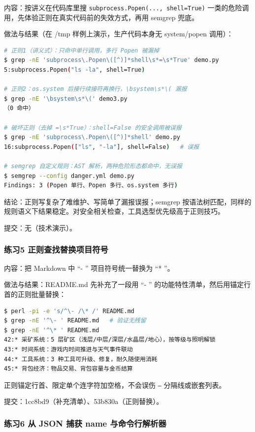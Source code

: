 \documentclass[UTF8]{ctexart}
\begin{document}
内容：按讲义在代码库里搜 \texttt{subprocess.Popen(..., shell=True)} 一类的危险调用，先体验正则在真实代码前的失效方式，再用 semgrep 兜底。

做法与结果（在 /tmp 样例上演示，生产代码本身无 system/popen 调用）：

\begin{lstlisting}[language=bash]
# 正则1（讲义式）：只命中单行调用，多行 Popen 被漏掉
$ grep -nE 'subprocess\.Popen\([^)]*shell\s*=\s*True' demo.py
5:subprocess.Popen("ls -la", shell=True)

# 正则2：os.system 后接行续接符再换行，\bsystem\s*\( 漏报
$ grep -nE '\bsystem\s*\(' demo3.py
（0 命中）

# 破坏正则（去掉 =\s*True）：shell=False 的安全调用被误报
$ grep -nE 'subprocess\.Popen\([^)]*shell' demo.py
16:subprocess.Popen(["ls", "-la"], shell=False)   # 误报

# semgrep 自定义规则：AST 解析，两种危险形态都命中，无误报
$ semgrep --config danger.yml demo.py
Findings: 3 (Popen 单行、Popen 多行、os.system 多行)
\end{lstlisting}

结论：正则写复杂了难维护、写简单了漏报误报；semgrep 按语法树匹配，同样的规则语义下结果稳定。对安全相关检查，工具选型优先级高于正则技巧。

提交：无（技术演示）。

\subsubsection{练习5 正则查找替换项目符号}

内容：把 Markdown 中 ``- '' 项目符号统一替换为 ``* ''。

做法与结果：README.md 先补充了一段用 ``- '' 的功能特性清单，然后用锚定行首的正则批量替换：

\begin{lstlisting}[language=bash]
$ perl -pi -e 's/^\- /\* /' README.md
$ grep -nE '^\- ' README.md   # 验证无残留
$ grep -nE '^\* ' README.md
42:* 采矿系统：5 层矿区（浅层/中层/深层/水晶层/地心），按等级与照明解锁
43:* 时间系统：游戏内时间推进与天气事件联动
44:* 工具系统：3 种工具可升级、修复，耐久随使用消耗
45:* 背包经济：物品交易、背包容量与金币结算
\end{lstlisting}

正则锚定行首、限定单个连字符加空格，不会误伤 \texttt{---} 分隔线或嵌套列表。

提交：1cc8bd9（补充清单）、53b830a（正则替换）。

\subsubsection{练习6 从 JSON 捕获 name 与命令行解析器}
\end{document}
